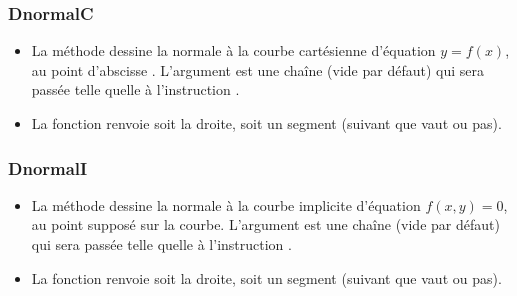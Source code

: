 \subsubsection{DnormalC}
\begin{itemize}
    \item La méthode  dessine la normale à la courbe cartésienne d'équation \(y=f(x)\), au point d'abscisse . \arguLong{} L'argument  est une chaîne (vide par défaut) qui sera passée telle quelle à l'instruction \drawcmd.
    \item La fonction  renvoie soit la droite, soit un segment (suivant que  vaut \nil ou pas).
\end{itemize}

\subsubsection{DnormalI}
\begin{itemize}
    \item La méthode  dessine la normale à la courbe implicite d'équation \(f(x,y)=0\), au point  supposé sur la courbe. \arguLong{} L'argument  est une chaîne (vide par défaut) qui sera passée telle quelle à l'instruction \drawcmd.
    \item La fonction  renvoie soit la droite, soit un segment (suivant que  vaut \nil ou pas).
\end{itemize}
  

